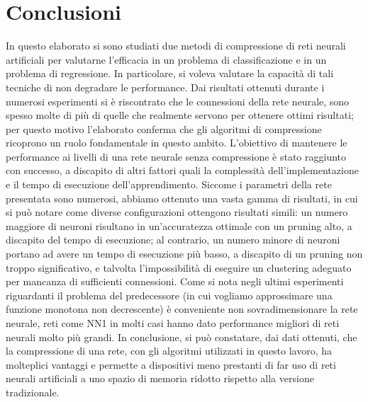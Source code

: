 \documentclass[11pt,a4paper,twoside,
openright]{book}
\begin{document}
	
	
	
\chapter*{Conclusioni}
In questo elaborato si sono studiati due metodi di compressione di reti neurali artificiali per valutarne l’efficacia in un problema di classificazione e in un problema di regressione. In particolare, si voleva valutare la capacità di tali tecniche di non degradare le performance. Dai risultati ottenuti durante i numerosi esperimenti si è riscontrato che le connessioni della rete neurale, sono spesso molte di più di quelle che realmente servono per ottenere ottimi risultati; per questo motivo l’elaborato conferma che gli algoritmi di compressione ricoprono un ruolo fondamentale in questo ambito. L’obiettivo di mantenere le performance ai livelli di una rete neurale senza compressione è stato raggiunto con successo, a discapito di altri fattori  quali la complessità dell’implementazione e il tempo di esecuzione dell’apprendimento. Siccome i parametri della rete presentata sono numerosi, abbiamo ottenuto una vasta gamma di risultati, in cui si può notare come diverse configurazioni ottengono risultati simili: un numero maggiore di neuroni risultano in un’accuratezza ottimale con un pruning alto, a discapito del tempo di esecuzione; al contrario, un numero minore di neuroni portano ad avere un tempo di esecuzione più basso, a discapito di un pruning non troppo significativo, e talvolta l’impossibilità di eseguire un clustering adeguato per mancanza di sufficienti connessioni. Come si nota negli ultimi esperimenti riguardanti il problema del predecessore (in cui vogliamo approssimare una funzione monotona non decrescente) è conveniente non sovradimensionare la rete neurale, reti come NN1 in molti casi hanno dato performance migliori di reti neurali molto più grandi. In conclusione, si può constatare, dai dati ottenuti, che la compressione di una rete, con gli algoritmi utilizzati in questo lavoro, ha molteplici vantaggi e permette a dispositivi meno prestanti di far uso di reti neurali artificiali a uno spazio di memoria ridotto rispetto alla versione tradizionale.
{}

\end{document}
